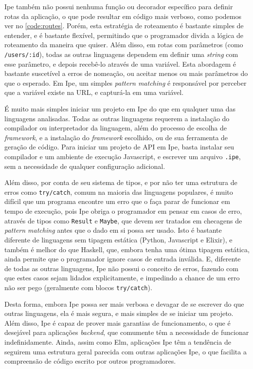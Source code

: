 Ipe também não possui nenhuma função ou decorador específico para definir rotas da aplicação, o que
pode resultar em código mais verboso, como podemos ver no \autoref{code:routes}. Porém, esta
estratégia de roteamento é bastante simples de entender, e é bastante flexível, permitindo que o
programador divida a lógica de roteamento da maneira que quiser. Além disso, em rotas com parâmetros
(como \texttt{/users/:id}), todas as outras linguagens dependem em definir uma \textit{string} com esse
parâmetro, e depois recebê-lo através de uma variável. Esta abordagem é bastante suscetível a erros
de nomeação, ou aceitar menos ou mais parâmetros do que o esperado. Em Ipe, um simples \textit{pattern
  matching} é responsável por perceber que a variável existe na URL, e capturá-la em uma variável.

É muito mais simples iniciar um projeto em Ipe do que em qualquer uma das linguagens analisadas. Todas
as outras linguagens requerem a instalação do compilador ou interpretador da linguagem, além do processo
de escolha de \textit{framework}, e a instalação do \textit{framework} escolhido, ou de sua ferramenta
de geração de código. Para iniciar um projeto de API em Ipe, basta instalar seu compilador e um ambiente
de execução Javascript, e escrever um arquivo \texttt{.ipe}, sem a necessidade de qualquer configuração
adicional.

Além disso, por conta de seu sistema de tipos, e por não ter uma estrutura de erros como \texttt{try/catch},
comum na maioria das linguagens populares, é muito difícil que um programa encontre um erro que
o faça parar de funcionar em tempo de execução, pois Ipe obriga o programador em pensar em casos de
erro, através de tipos como \texttt{Result} e \texttt{Maybe}, que devem ser tratados em checagens de
\textit{pattern matching} antes que o dado em si possa ser usado. Isto é bastante diferente de linguagens
sem tipagem estática (Python, Javascript e Elixir), e também é melhor do que Haskell, que, embora tenha
uma ótima tipagem estática, ainda permite que o programador ignore casos de entrada inválida. E,
diferente de todas as outras linguagens, Ipe não possui o conceito de erros, fazendo com que estes
casos sejam lidados explicitamente, e impedindo a chance de um erro não ser pego (geralmente com blocos
\texttt{try/catch}).

Desta forma, embora Ipe possa ser mais verbosa e devagar de se escrever do que outras linguagens,
ela é mais segura, e mais simples de se iniciar um projeto. Além disso, Ipe é capaz de prover mais
garantias de funcionamento, o que é desejável para aplicações \textit{backend}, que comumente têm a
necessidade de funcionar indefinidamente. Ainda, assim como Elm, aplicações Ipe têm a tendência de
seguirem uma estrutura geral parecida com outras aplicações Ipe, o que facilita a compreensão de
código escrito por outros programadores.
